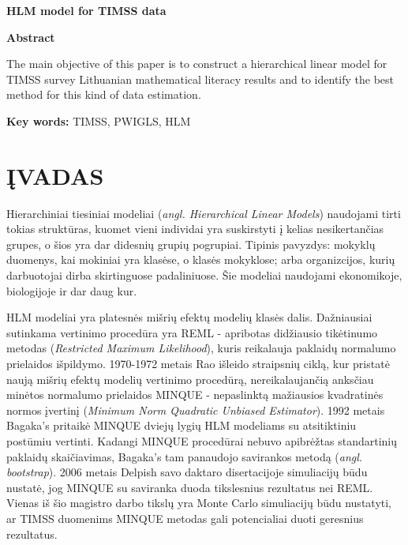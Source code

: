 \documentclass[12pt,a4paper]{article}
\begin{document}
\begin{center}{\large\textbf{HLM model for TIMSS data}}\end{center}

\begin{small}
\vspace{2\baselineskip}
\begin{center}\textbf{Abstract}\end{center}

\indent The main objective of this paper is to construct a hierarchical linear model for TIMSS survey Lithuanian mathematical literacy results and to identify the best method for this kind of data estimation.

\vspace{\baselineskip}

\noindent\textbf{Key words:}
TIMSS, PWIGLS, HLM
\end{small}
\vspace{\baselineskip}

\newpage
\section{ĮVADAS}

\indent Hierarchiniai tiesiniai modeliai (\textit{angl. Hierarchical Linear Models}) naudojami tirti tokias struktūras, kuomet vieni individai yra suskirstyti į kelias nesikertančias grupes, o šios yra dar didesnių grupių pogrupiai. Tipinis pavyzdys: mokyklų duomenys, kai mokiniai yra klasėse, o klasės mokyklose; arba organizcijos, kurių darbuotojai dirba skirtinguose padaliniuose. Šie modeliai naudojami ekonomikoje, biologijoje ir dar daug kur.

\indent HLM modeliai yra platesnės mišrių efektų modelių klasės dalis. Dažniausiai sutinkama vertinimo procedūra yra REML - apribotas didžiausio tikėtinumo metodas (\textit{Restricted Maximum Likelihood}), kuris reikalauja paklaidų normalumo prielaidos išpildymo. 1970-1972 metais Rao išleido straipsnių ciklą, kur pristatė naują mišrių efektų modelių vertinimo procedūrą, nereikalaujančią anksčiau minėtos normalumo prielaidos MINQUE - nepaslinktą mažiausios kvadratinės normos įvertinį (\textit{Minimum Norm Quadratic Unbiased Estimator}). 
1992 metais Bagaka's pritaikė MINQUE dviejų lygių HLM modeliams su atsitiktiniu postūmiu vertinti. Kadangi MINQUE procedūrai nebuvo apibrėžtas standartinių paklaidų skaičiavimas, Bagaka's tam panaudojo savirankos metodą (\textit{angl. bootstrap}). 2006 metais Delpish savo daktaro disertacijoje simuliacijų būdu nustatė, jog MINQUE su saviranka duoda tikslesnius rezultatus nei REML. Vienas iš šio magistro darbo tikslų yra Monte Carlo simuliacijų būdu nustatyti, ar TIMSS duomenims MINQUE metodas gali potencialiai duoti geresnius rezultatus.
\end{document}
